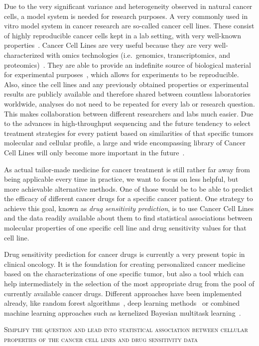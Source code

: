Due to the very significant variance and heterogeneity observed in natural cancer cells, a model system is needed for research purposes. A very commonly used in vitro model system in cancer research are so-called cancer cell lines. These consist of highly reproducible cancer cells kept in a lab setting, with very well-known properties~\cite{cancer_cell_line_definition}. Cancer Cell Lines are very useful because they are very well-characterized with omics technologies (i.e.\ genomics, transcriptomics, and proteomics)~\cite{cancer_cell_lines_useful_model}. They are able to provide an indefinite source of biological material for experimental purposes~\cite{cancer_cell_lines_useful_model}, which allows for experiments to be reproducible. Also, since the cell lines and any previously obtained properties or experimental results are publicly available and therefore shared between countless laboratories worldwide, analyses do not need to be repeated for every lab or research question. This makes collaboration between different researchers and labs much easier. Due to the advances in high-throughput sequencing and the future tendency to select treatment strategies for every patient based on similarities of that specific tumors molecular and cellular profile, a large and wide encompassing library of Cancer Cell Lines will only become more important in the future~\cite{cancer_cell_lines_useful_model}.

As actual tailor-made medicine for cancer treatment is still rather far away from being applicable every time in practice, we want to focus on less helpful, but more achievable alternative methods. One of those would be to be able to predict the efficacy of different cancer drugs for a specific cancer patient. One strategy to achieve this goal, known as \textit{drug sensitivity prediction}, is to use Cancer Cell Lines and the data readily available about them to find statistical associations between molecular properties of one specific cell line and drug sensitivity values for that cell line.

Drug sensitivity prediction for cancer drugs is currently a very present topic in clinical oncology. It is the foundation for creating personalized cancer medicine based on the characterizations of one specific tumor, but also a tool which can help intermediately in the selection of the most appropriate drug from the pool of currently available cancer drugs. Different approaches have been implemented already, like random forest algorithms~\cite{predicting_drug_sensitivity_random_forests}, deep learning methods~\cite{predicting_drug_sensitivity_deep_learning} or combined machine learning approaches such as kernelized Bayesian multitask learning~\cite{predicting_drug_sensitivity_bayes}.

\textsc{Simplify the question and lead into statistical association between cellular properties of the cancer cell lines and drug sensitivity data}